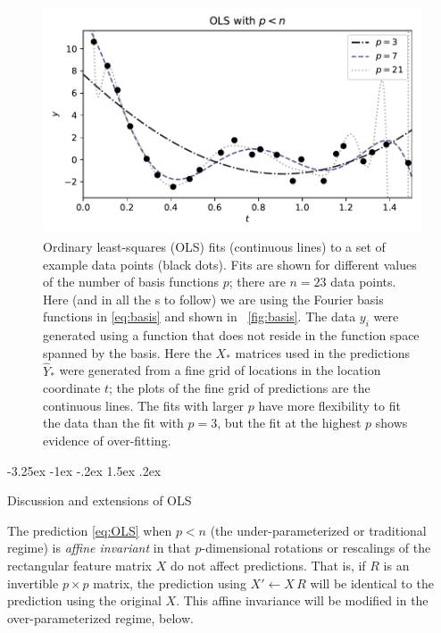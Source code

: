\documentclass[12pt,letterpaper]{article}
\makeatletter
\newlength{\figurewidth}
\renewcommand\section{\@startsection {section}{1}{\z@}%
  {-3.25ex \@plus -1ex \@minus -.2ex}%
  {1.5ex \@plus .2ex}%
  {\raggedright\normalfont\large\bfseries}}
\makeatother
\begin{document}
\begin{figure}[t]
    \begin{mdframed}
    \includegraphics[width=\figurewidth]{./OLS-under (1).pdf}
    \caption{Ordinary least-squares (OLS) fits (continuous lines) to a set of example data points (black dots). Fits are shown for different values of the number of basis functions $p$; there are $n=23$ data points. Here (and in all the \figurename s to follow) we are using the Fourier basis functions in \eqref{eq:basis} and shown in \figurename~\ref{fig:basis}. The data $y_i$ were generated using a function that does not reside in the function space spanned by the basis. Here the $X_\ast$ matrices used in the predictions $\hat{Y}_\ast$ were generated from a fine grid of locations in the location coordinate $t$; the plots of the fine grid of predictions are the continuous lines. The fits with larger $p$ have more flexibility to fit the data than the fit with $p=3$, but the fit at the highest $p$ shows evidence of over-fitting.}
    \label{fig:ols1}
    \end{mdframed}
\end{figure}

\section{Discussion and extensions of OLS}\label{sec:extensions}

The prediction \eqref{eq:OLS} when $p<n$ (the under-parameterized or traditional regime) is \emph{affine invariant} in that $p$-dimensional rotations or rescalings of the rectangular feature matrix $X$ do not affect predictions.
That is, if $R$ is an invertible $p\times p$ matrix, the prediction using $X'\leftarrow X\,R$ will be identical to the prediction using the original $X$.
This affine invariance will be modified in the over-parameterized regime, below.
\end{document}
